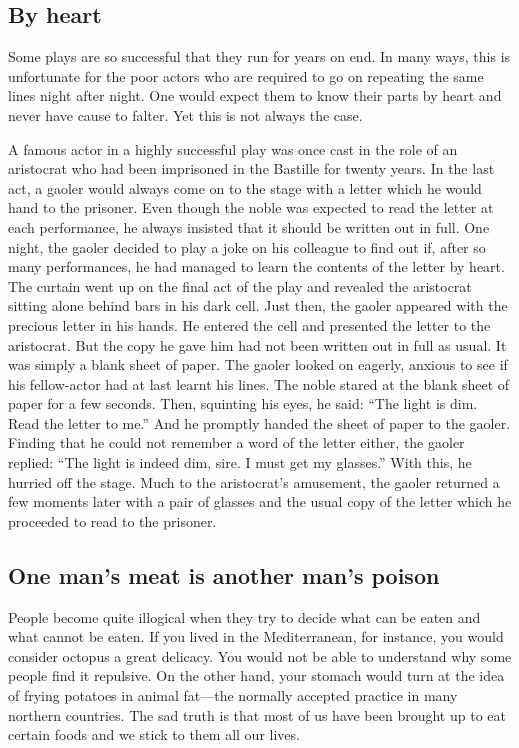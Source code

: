 \documentclass[11pt]{article}
\begin{document}
\subsection{By heart}
\label{sec-1-22}

Some plays are so successful that they run for years on end. In many ways, this is unfortunate for the poor actors who are required to go on repeating the same lines night after night. One would expect them to know their parts by heart and never have cause to falter. Yet this is not always the case.

A famous actor in a highly successful play was once cast in the role of an aristocrat who had been imprisoned in the Bastille for twenty years. In the last act, a gaoler would always come on to the stage with a letter which he would hand to the prisoner. Even though the noble was expected to read the letter at each performance, he always insisted that it should be written out in full. One night, the gaoler decided to play a joke on his colleague to find out if, after so many performances, he had managed to learn the contents of the letter by heart. The curtain went up on the final act of the play and revealed the aristocrat sitting alone behind bars in his dark cell. Just then, the gaoler appeared with the precious letter in his hands. He entered the cell and presented the letter to the aristocrat. But the copy he gave him had not been written out in full as usual. It was simply a blank sheet of paper. The gaoler looked on eagerly, anxious to see if his fellow-actor had at last learnt his lines. The noble stared at the blank sheet of paper for a few seconds. Then, squinting his eyes, he said: ``The light is dim. Read the letter to me.'' And he promptly handed the sheet of paper to the gaoler. Finding that he could not remember a word of the letter either, the gaoler replied: ``The light is indeed dim, sire. I must get my glasses.'' With this, he hurried off the stage. Much to the aristocrat's amusement, the gaoler returned a few moments later with a pair of glasses and the usual copy of the letter which he proceeded to read to the prisoner.
\subsection{One man's meat is another man's poison}
\label{sec-1-23}

People become quite illogical when they try to decide what can be eaten and what cannot be eaten. If you lived in the Mediterranean, for instance, you would consider octopus a great delicacy. You would not be able to understand why some people find it repulsive. On the other hand, your stomach would turn at the idea of frying potatoes in animal fat---the normally accepted practice in many northern countries. The sad truth is that most of us have been brought up to eat certain foods and we stick to them all our lives.
\end{document}
